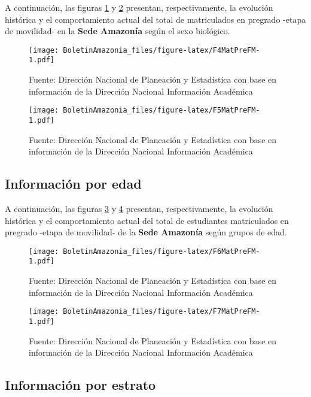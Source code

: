 \documentclass[
]{book}
\begin{document}
A continuación, las figuras \ref{fig:F4MatPreFM} y \ref{fig:F5MatPreFM} presentan, respectivamente, la evolución histórica y el comportamiento actual del total de matriculados en pregrado -etapa de movilidad- en la \textbf{Sede Amazonía} según el sexo biológico.

\begin{figure}
\centering
\texttt{[image: BoletinAmazonia\_files/figure-latex/F4MatPreFM-1.pdf]}
\caption{\label{fig:F4MatPreFM}Fuente: Dirección Nacional de Planeación y Estadística con base en información de la Dirección Nacional Información Académica}
\end{figure}

\begin{figure}
\centering
\texttt{[image: BoletinAmazonia\_files/figure-latex/F5MatPreFM-1.pdf]}
\caption{\label{fig:F5MatPreFM}Fuente: Dirección Nacional de Planeación y Estadística con base en información de la Dirección Nacional Información Académica}
\end{figure}

\hypertarget{informaciuxf3n-por-edad-6}{%
\subsection{Información por edad}\label{informaciuxf3n-por-edad-6}}

A continuación, las figuras \ref{fig:F6MatPreFM} y \ref{fig:F7MatPreFM} presentan, respectivamente, la evolución histórica y el comportamiento actual del total de estudiantes matriculados en pregrado -etapa de movilidad- de la \textbf{Sede Amazonía} según grupos de edad.

\begin{figure}
\centering
\texttt{[image: BoletinAmazonia\_files/figure-latex/F6MatPreFM-1.pdf]}
\caption{\label{fig:F6MatPreFM}Fuente: Dirección Nacional de Planeación y Estadística con base en información de la Dirección Nacional Información Académica}
\end{figure}

\begin{figure}
\centering
\texttt{[image: BoletinAmazonia\_files/figure-latex/F7MatPreFM-1.pdf]}
\caption{\label{fig:F7MatPreFM}Fuente: Dirección Nacional de Planeación y Estadística con base en información de la Dirección Nacional Información Académica}
\end{figure}

\hypertarget{informaciuxf3n-por-estrato-2}{%
\subsection{Información por estrato}\label{informaciuxf3n-por-estrato-2}}
\end{document}
